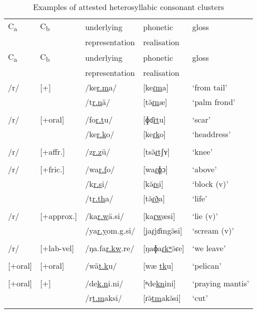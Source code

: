 \begin{longtable}{p{}p{}lll}
\caption{Examples of attested heterosyllabic consonant clusters}
\label{heterosyllcctableexamples}
		\\
		\lsptoprule
		C\textsubscript{a} & C\textsubscript{b} & {underlying} & {phonetic} & {gloss}\\
		&&{representation}& {realisation}&\\ \midrule
		\endfirsthead
		C\textsubscript{a} & C\textsubscript{b} & {underlying} & {phonetic} & {gloss}\\
		&&{representation}& {realisation}&\\ \midrule
		\endhead
		/r/ & [+\isi{nasal}] & /ke\uline{r.m}a/&[ke\uline{ɾm}a] &`from tail'\\
		&&/t\uline{r.n}ä/ &[tə̆\uline{ɾn}æ] &`palm frond'\\
		&&&&\\
		/r/ &[+oral] & /fo\uline{r.t}u/&[ɸɞ̆\uline{ɾt}u] &`scar'\\
		&& /ke\uline{r.k}o/&[ke\uline{ɾk}o] &`headdress'\\
		&&&&\\
		/r/ &[+affr.]&/z\uline{r.z}ü/&[tsə̆\uline{ɾtʃ}ʏ] &`knee' \\
		&&&&\\
		/r/ &[+fric.] & /wa\uline{r.f}o/&[wa\uline{ɾɸ}ɔ] &`above'\\
		&&/k\uline{r.s}i/&[kə̆\uline{ɾs}i] &`block (v)'\\
		&&/t\uline{r.th}a/&[tə̆\uline{ɾð}a] &`life'\\
		&&&&\\
		/r/&[+approx.]&/ka\uline{r.w}ä.si/&[ka\uline{ɾw}æsi] &`lie (v)'\\
		&&/ya\uline{r.y}om.g.si/&[ja\uline{ɾj}ɞ̆m{\ᵑ}gə̆si] &`scream (v)'\\
		&&&&\\
		/r/&[+lab-vel]&/ŋa.fa\uline{r.kw}.re/&[ŋaɸa\uline{ɾkʷ}ə̆ɾe]&`we leave'\\
		&&&&\\
		{[+oral]}&[+oral]&/wä\uline{t.k}u/&[wæ \uline{tk}u]&`pelican'\\
		&&&&\\
		{[+oral]} &[+\isi{nasal}]&/de\uline{k.n}i.ni/&[ⁿde\uline{kn}ini]&`praying mantis'\\
		&&/r\uline{t.m}aksi/&[ɾə̆\uline{tm}akə̆si]&`cut'\\
		&&&&\\

\end{longtable}
